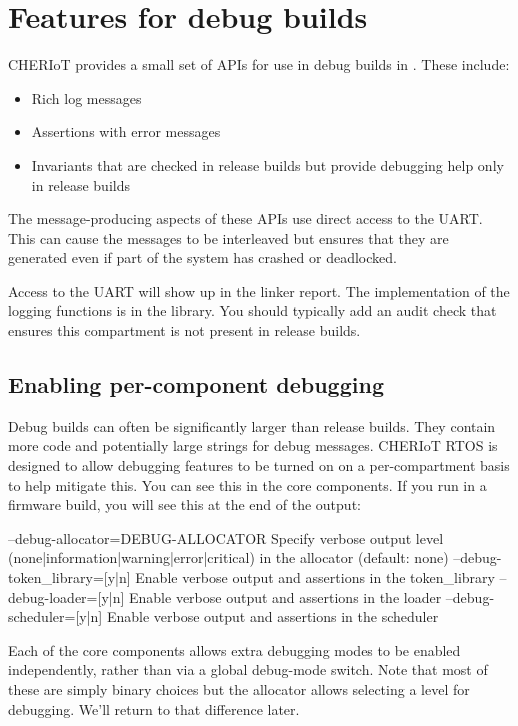 \chapter[label=debug]{Features for debug builds}

CHERIoT provides a small set of APIs for use in debug builds in .
These include:

\begin{itemize}
	\item{Rich log messages}
	\item{Assertions with error messages}
	\item{Invariants that are checked in release builds but provide debugging help only in release builds}
\end{itemize}

The message-producing aspects of these APIs use direct access to the UART.
This can cause the messages to be interleaved but ensures that they are generated even if part of the system has crashed or deadlocked.

Access to the UART will show up in the linker report.
The implementation of the logging functions is in the  library.
You should typically add an audit check that ensures this compartment is not present in release builds.

\section{Enabling per-component debugging}

Debug builds can often be significantly larger than release builds.
They contain more code and potentially large strings for debug messages.
CHERIoT RTOS is designed to allow debugging features to be turned on on a per-compartment basis to help mitigate this.
You can see this in the core components.
If you run  in a firmware build, you will see this at the end of the output:

\begin{console}
--debug-allocator=DEBUG-ALLOCATOR Specify verbose output level (none|information|warning|error|critical) in the allocator (default: none)
--debug-token_library=[y|n] Enable verbose output and assertions in the token_library
--debug-loader=[y|n]        Enable verbose output and assertions in the loader
--debug-scheduler=[y|n]     Enable verbose output and assertions in the scheduler
\end{console}

Each of the core components allows extra debugging modes to be enabled independently, rather than via a global debug-mode switch.
Note that most of these are simply binary choices but the allocator allows selecting a level for debugging.
We'll return to that difference later.

